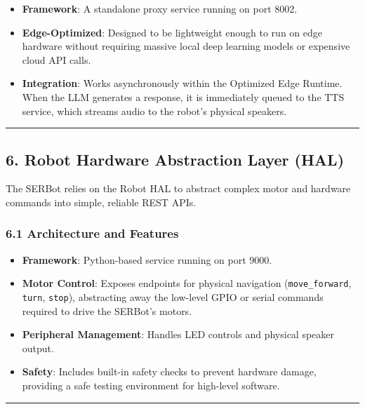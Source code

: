 \documentclass[
]{article}
\providecommand{\tightlist}{%
  \setlength{\itemsep}{0pt}\setlength{\parskip}{0pt}}
\begin{document}
\begin{itemize}
\tightlist
\item
  \textbf{Framework}: A standalone proxy service running on port 8002.
\item
  \textbf{Edge-Optimized}: Designed to be lightweight enough to run on
  edge hardware without requiring massive local deep learning models or
  expensive cloud API calls.
\item
  \textbf{Integration}: Works asynchronously within the Optimized Edge
  Runtime. When the LLM generates a response, it is immediately queued
  to the TTS service, which streams audio to the robot's physical
  speakers.
\end{itemize}

\begin{center}\rule{0.5\linewidth}{0.5pt}\end{center}

\subsection{6. Robot Hardware Abstraction Layer
(HAL)}\label{robot-hardware-abstraction-layer-hal}

The SERBot relies on the Robot HAL to abstract complex motor and
hardware commands into simple, reliable REST APIs.

\subsubsection{6.1 Architecture and
Features}\label{architecture-and-features}

\begin{itemize}
\tightlist
\item
  \textbf{Framework}: Python-based service running on port 9000.
\item
  \textbf{Motor Control}: Exposes endpoints for physical navigation
  (\texttt{move\_forward}, \texttt{turn}, \texttt{stop}), abstracting
  away the low-level GPIO or serial commands required to drive the
  SERBot's motors.
\item
  \textbf{Peripheral Management}: Handles LED controls and physical
  speaker output.
\item
  \textbf{Safety}: Includes built-in safety checks to prevent hardware
  damage, providing a safe testing environment for high-level software.
\end{itemize}

\begin{center}\rule{0.5\linewidth}{0.5pt}\end{center}
\end{document}
